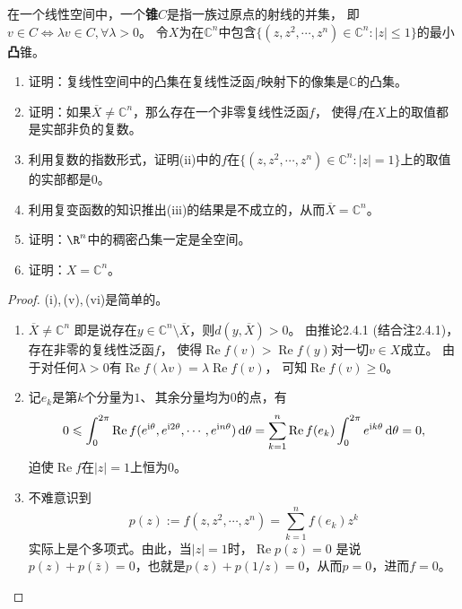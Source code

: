 \begin{13}[复线性空间中的凸锥]
    在一个线性空间中，一个\textbf{锥}$C$是指一族过原点的射线的并集，
    即$v \in C \Leftrightarrow \lambda v \in C,\forall\lambda>0$。
    令$X$为在$\mathbb{C}^n$中包含$\{(z,z^2,\cdots,z^n)\in\mathbb{C}^n:|z|\leqslant1\}$的最小\textbf{凸}锥。
    \begin{enumerate}[label=(\roman*)]
    \item 证明：复线性空间中的凸集在复线性泛函$f$映射下的像集是$\mathbb{C}$的凸集。
    \item 证明：如果$\overline{X}\ne\mathbb{C}^n$，那么存在一个非零复线性泛函$f$，
    使得$f$在$X$上的取值都是实部非负的复数。
    \item 利用复数的指数形式，证明(ii)中的$f$在$\{(z,z^2,\cdots,z^n)\in\mathbb{C}^n:|z|=1\}$上的取值的实部都是$0$。
    \item 利用复变函数的知识推出(iii)的结果是不成立的，从而$\overline{X}=\mathbb{C}^n$。
    \item 证明：$\R^n$中的稠密凸集一定是全空间。
    \item 证明：$X=\mathbb{C}^n$。
\end{enumerate}
\end{13}
\begin{proof}
    (i),\,(v),\,(vi)是简单的。
    \begin{enumerate}
    \item[(ii)] $\overline{X}\ne\mathbb{C}^n$
    即是说存在$y\in\mathbb{C}^n\setminus\overline{X}$，则$d(y,\overline{X})>0$。
    由推论2.4.1 (结合注2.4.1)，存在非零的复线性泛函$f$，
    使得$\operatorname{Re}f(v)>\operatorname{Re}f(y)$对一切$v \in X$成立。
    由于对任何$\lambda>0$有$\operatorname{Re}f(\lambda v)=\lambda \operatorname{Re}f(v)$，
    可知$\operatorname{Re}f(v)\geqslant0$。

    \item[(iii)] 记$e_k$是第$k$个分量为$1$、\,其余分量均为$0$的点，有
    \[0\leqslant\int_{0}^{2\pi}\operatorname{Re}f(e^{{\rm i}\theta},e^{{\rm i}2\theta},\cdots,e^{{\rm i}n\theta})\,{\rm d}\theta
    =\sum_{k=1}^n\operatorname{Re}f(e_k)\int_{0}^{2\pi}e^{{\rm i}k\theta}\,{\rm d}\theta=0,\]
    迫使$\operatorname{Re}f$在$|z|=1$上恒为$0$。

    \item[(iv)] 不难意识到
    \[p(z):=f(z,z^2,\cdots,z^n)=\sum_{k=1}^nf(e_k)z^k\]
    实际上是个多项式。由此，当$|z|=1$时，$\operatorname{Re}p(z)=0$
    是说$p(z)+p(\bar{z})=0$，也就是$p(z)+p(1/z)=0$，从而$p=0$，进而$f=0$。\qedhere
    \end{enumerate}
\end{proof}

